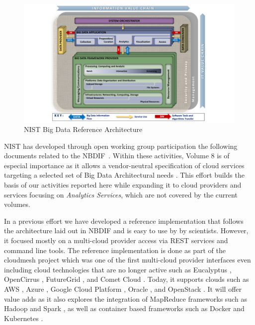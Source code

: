 \begin{figure}[htb]
\centering

\includegraphics[width=1.0\columnwidth]{images/NIST_RA_latest-crop.pdf}

\caption{NIST Big Data Reference Architecture \cite{nist-v8}}

\label{fig:bdra}
\end{figure}

NIST has developed through open working group participation the
following documents related to the
NBDIF~\cite{nist-v1,nist-v2,nist-v3,nist-v4,nist-v5,nist-v6,nist-v7,nist-v8,nist-v9}. Within
these activities, Volume 8 is of especial importance as it allows a
vendor-neutral specification of cloud services targeting a selected
set of Big Data Architectural needs
\cite{cloudmesh-rest,cloudmesh-book}. This effort builds the basis of
our activities reported here while expanding it to cloud providers and
services focusing on {\em Analytics Services}, which are not covered
by the current volumes. 

In a previous effort we have developed a reference implementation that follows the architecture laid out in NBDIF and is easy to use by by scientists. 
However, it focused mostly on a multi-cloud provider access via REST services and command line tools. The reference implementation is done as part of the cloudmesh project which was one of the first multi-cloud provider interfaces even including cloud technologies that are no longer active such as Eucalyptus \cite{??}, OpenCirrus \cite{opencirrus}, FutureGrid \cite{futuregrid}, and Comet Cloud \cite{??}. Today, it supports clouds such as AWS \cite{www-aws}, Azure \cite{www-azure}, Google Cloud Platform \cite{??}, Oracle \cite{??}, and OpenStack \cite{www-openStack}. It will offer value adds as it also explores the integration of MapReduce frameworks such as Hadoop \cite{??} and Spark \cite{??}, as well as container based frameworks such as Docker \cite{??} and Kubernetes \cite{??}. 

